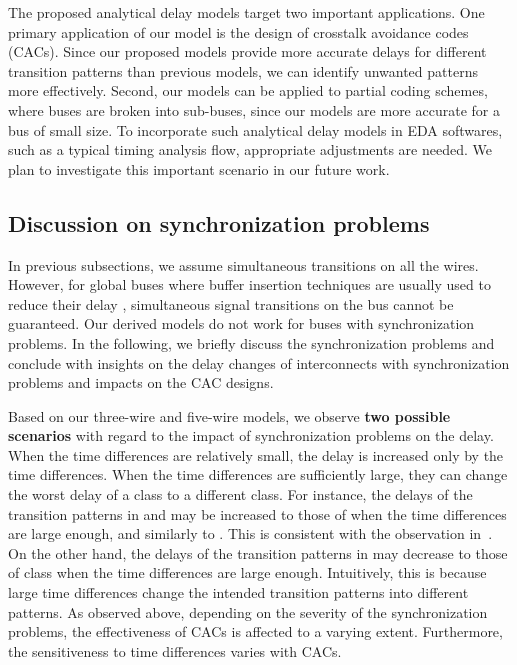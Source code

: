\documentclass[10pt,journal]{IEEEtran}
\begin{document}
The proposed analytical delay models target two important applications. One primary application of our model is the design of crosstalk avoidance codes (CACs). Since our proposed models provide more accurate delays for different transition patterns than previous models, we can identify unwanted patterns more effectively. Second, our models can be applied to partial coding schemes, where buses are broken into sub-buses, since our models are more accurate for a bus of small size.
To incorporate such analytical delay models in EDA softwares, such as a typical timing analysis flow, appropriate adjustments are needed. We plan to investigate this important scenario in our future work.







\subsection{Discussion on synchronization problems}
\label{sec:sync}

In previous subsections, we assume simultaneous transitions on all the wires. However, for global buses where buffer insertion techniques are usually used to reduce their delay \cite{Tsa06}, simultaneous signal transitions on the bus cannot be guaranteed. Our derived models do not work for buses with synchronization problems.
In the following, we briefly discuss the synchronization problems and conclude with insights on the delay changes of interconnects with synchronization problems and impacts on the CAC designs.

Based on our three-wire and five-wire models, we observe \textbf{two possible scenarios} with regard to the impact of synchronization problems on the delay. When the time differences are relatively small, the delay is increased only by the time differences. When the time differences are sufficiently large, they can change the worst delay of a class to a different class. For instance, the delays of the transition patterns in  and  may be increased to those of  when the time differences are large enough, and similarly  to . This is consistent with the observation in~\cite{Dua04}. On the other hand, the delays of the transition patterns in  may decrease to those of  class when the time differences are large enough. Intuitively, this is because large time differences change the intended transition patterns into different patterns.
As observed above, depending on the severity of the synchronization problems, the effectiveness of CACs is affected to a varying extent. Furthermore, the sensitiveness to time differences varies with CACs.
\end{document}
